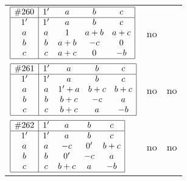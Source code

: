 \documentclass[12pt]{article}
\newcommand{\join}{\mathbin{+}}%
\newcommand{\id}{{1'}}%
\renewcommand{\div}{0'}
\renewcommand{\top}{1}%
\begin{document}
\begin{center}
\begin{longtable}{l|c|c}
$
\begin{array}{|c|cccc|} \hline
\#260 & \id & a & b & c \\ \hline
\id & \id & a & b & c \\
a & a & \top & a \join b & a \join c \\
b & b & a \join b & -c & 0 \\
c & c & a \join c & 0 & -b \\ \hline
\end{array}
$
 & no  
 & \adjustbox{valign=c, max height=1.6cm}{$
\left[ \begin{array}{cccccccc}
\id & a & a & b & a & a & b & a \\ 
a & \id & a & a & c & a & a & c \\ 
a & a & \id & b & a & a & b & a \\ 
b & a & b & \id & a & a & b & a \\ 
a & c & a & a & \id & c & a & c \\ 
a & a & a & a & c & \id & a & c \\ 
b & a & b & b & a & a & \id & a \\ 
a & c & a & a & c & c & a & \id
\end{array}\right]
$}      \\[15mm]

$
\begin{array}{|c|cccc|} \hline
\#261 & \id & a & b & c \\ \hline
\id & \id & a & b & c \\
a & a & \id \join a & b \join c & b \join c \\
b & b & b \join c & -c & a \\
c & c & b \join c & a & -b \\ \hline
\end{array}
$
 & no  
 & no      \\[15mm]

$
\begin{array}{|c|cccc|} \hline
\#262 & \id & a & b & c \\ \hline
\id & \id & a & b & c \\
a & a & -c & \div & b \join c \\
b & b & \div & -c & a \\
c & c & b \join c & a & -b \\ \hline
\end{array}
$
 & no  
 & no      \\[15mm]


\end{longtable}
\end{center}
\end{document}
